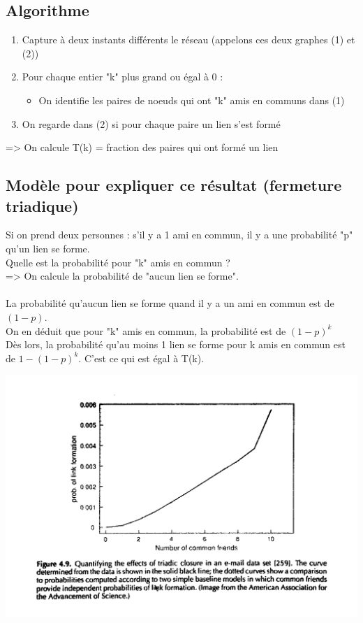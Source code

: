 \subsection{Algorithme}
\begin{enumerate}
\item Capture à deux instants différents le réseau (appelons ces deux graphes (1) et (2))
\item Pour chaque entier "k" plus grand ou égal à 0 :
\begin{itemize}
	\item On identifie les paires de noeuds qui ont "k" amis en communs dans (1)
\end{itemize}
\item On regarde dans (2) si pour chaque paire un lien s'est formé
\end{enumerate}
=> On calcule T(k) = fraction des paires qui ont formé un lien

\subsection{Modèle pour expliquer ce résultat (fermeture triadique)}
Si on prend deux personnes : s'il y a 1 ami en commun, il y a une probabilité "p" qu'un lien se forme.\\
Quelle est la probabilité pour "k" amis en commun ?\\
=> On calcule la probabilité de "aucun lien se forme".

\paragraph*{}
La probabilité qu'aucun lien se forme quand il y a un ami en commun est de $(1-p)$.\\
On en déduit que pour "k" amis en commun, la probabilité est de $ (1-p)^{k}$\\
Dès lors, la probabilité qu'au moins 1 lien se forme pour k amis en commun est de $ 1-(1-p)^{k}$. C'est ce qui est égal à T(k).

\includegraphics[width=\textwidth]{images/21_emailFriends.jpg}

